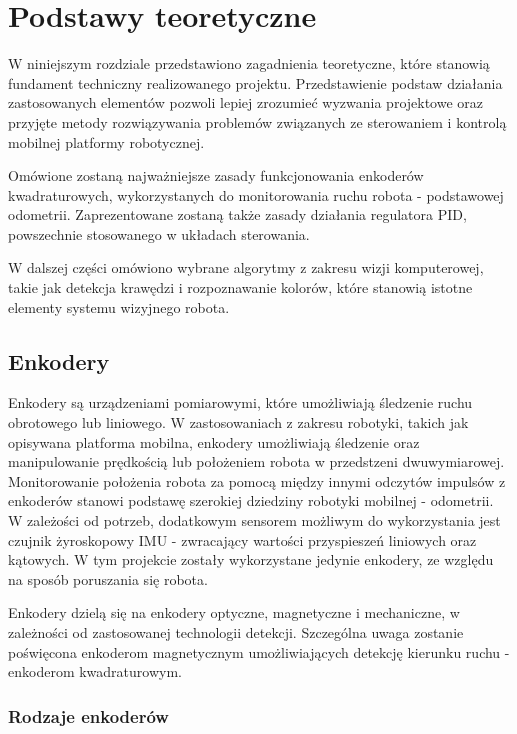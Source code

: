 \chapter{Podstawy teoretyczne}
\label{ch:podstawy-teoretyczne}

W niniejszym rozdziale przedstawiono zagadnienia teoretyczne, które stanowią fundament techniczny realizowanego projektu. Przedstawienie podstaw działania zastosowanych elementów pozwoli lepiej zrozumieć wyzwania projektowe oraz przyjęte metody rozwiązywania problemów związanych ze sterowaniem i kontrolą mobilnej platformy robotycznej.

Omówione zostaną najważniejsze zasady funkcjonowania enkoderów kwadraturowych, wykorzystanych do monitorowania ruchu robota - podstawowej odometrii. Zaprezentowane zostaną także zasady działania regulatora PID, powszechnie stosowanego w układach sterowania.

W dalszej części omówiono wybrane algorytmy z zakresu wizji komputerowej, takie jak detekcja krawędzi i rozpoznawanie kolorów, które stanowią istotne elementy systemu wizyjnego robota.

\section{Enkodery}
Enkodery są urządzeniami pomiarowymi, które umożliwiają śledzenie ruchu obrotowego lub liniowego. W zastosowaniach z zakresu robotyki, takich jak opisywana platforma mobilna, enkodery umożliwiają śledzenie oraz manipulowanie prędkością lub położeniem robota w przedstzeni dwuwymiarowej. Monitorowanie położenia robota za pomocą między innymi odczytów impulsów z enkoderów stanowi podstawę szerokiej dziedziny robotyki mobilnej - odometrii. W zależości od potrzeb, dodatkowym sensorem możliwym do wykorzystania jest czujnik żyroskopowy IMU - zwracający wartości przyspieszeń liniowych oraz kątowych. W tym projekcie zostały wykorzystane jedynie enkodery, ze względu na sposób poruszania się robota. 

Enkodery dzielą się na enkodery optyczne, magnetyczne i mechaniczne, w zależności od zastosowanej technologii detekcji. Szczególna uwaga zostanie poświęcona enkoderom magnetycznym umożliwiających detekcję kierunku ruchu - enkoderom kwadraturowym. 

\subsection{Rodzaje enkoderów}

